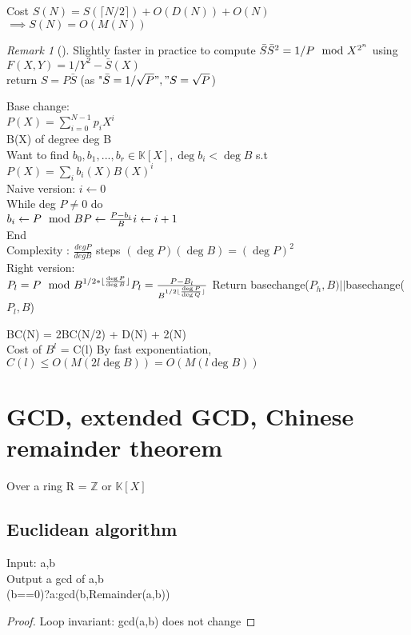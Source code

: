 \documentclass{article}
\theoremstyle{definition}
\theoremstyle{remark}
\newtheorem*{remark}{Remark}
\newcommand{\Rem}[3]{\begin{remark}[#1]\label{#2}#3\end{remark}}
\newcommand{\Proof}[1]{\begin{proof}#1\end{proof}}
\newcommand{\Z}{\mathbb{Z}}
\newcommand{\K}{\mathbb{K}}
\begin{document}
Cost $S(N) = S(\lceil N/2 \rceil) + O(D(N)) + O(N)$\\
$\implies S(N) = O(M(N))$

\Rem{}{}{Slightly faster in practice to compute $\bar{S}\\
	\bar{S}^2 = 1/P \mod X^{2^n}$ using $F(X,Y) = 1/Y^2 - \bar{S}(X)$\\
	return $S = P\bar{S}$ (as "$\bar{S} = 1/\sqrt{P}", "S=\sqrt{P}$)\\}

Base change:\\
$P(X) = \sum_{i=0}^{N-1} p_iX^i$\\
B(X) of degree deg B\\
Want to find $b_0,b_1,...,b_r \in \K[X], \deg b_i < \deg B$ s.t $P(X) = \sum_i b_i(X)B(X)^i$\\
Naive version:
$i \gets 0$\\
While deg $P \neq 0$ do\\
$b_i \gets P \mod B\\
P \gets \frac{P-b_i}{B}\\
i \gets i+1$\\
End\\

Complexity : $\frac{deg P}{deg B}$ steps $(\deg P)(\deg B) = (\deg P)^2$\\

Right version:\\
$P_l = P \mod B^{1/2*\lfloor\frac{\deg P}{\deg B}\rfloor}\\
P_l = \frac{P - B_l}{B^{1/2\lfloor\frac{\deg P}{\deg Q}\rfloor}}\\$
Return basechange($P_h,B)||$basechange($P_l,B$)

BC(N) = 2BC(N/2) + D(N) + 2(N)\\
Cost of $B^l$ = C(l)
By fast exponentiation, $C(l) \leq O(M(2l\deg B)) = O(M(l\deg B))$

\section{GCD, extended GCD, Chinese remainder theorem}
Over a ring R = $\Z$ or $\K[X]$
\subsection{Euclidean algorithm}
Input: a,b\\
Output a gcd of a,b\\
(b==0)?a:gcd(b,Remainder(a,b))

\Proof{Loop invariant: gcd(a,b) does not change}
\end{document}
